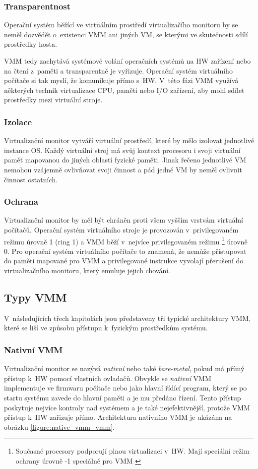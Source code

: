 \subsubsection{Transparentnost}
\label{chapter:virtualization:vmm:demands:transparency}
Operační systém běžící ve virtuálním prostředí virtualizačího monitoru by se neměl dozvědět o~existenci VMM ani jiných VM,
se kterými ve skutečnosti sdílí prostředky hosta.

VMM tedy zachytává systémové volání operačních systémů na HW zařízení nebo na čtení z~paměti a transparentně je vyřizuje.
Operační systém virtuálního počítače si tak myslí, že komunikuje přímo s~HW. V~této fázi VMM využívá některých technik virtualizace
CPU, paměti nebo I/O zařízení, aby mohl sdílet prostředky mezi virtuální stroje.
\subsubsection{Izolace}
\label{chapter:virtualization:vmm:demands:isolation}
Virtualizační monitor vytváří virtuální prostředí, které by mělo izolovat jednotlivé instance OS. Každý virtuální stroj má 
svůj kontext procesoru i svoji virtuální paměť mapovanou do jiných oblastí fyzické paměti. Jinak řečeno jednotlivé VM nemohou
vzájemně ovlivňovat svoji činnost a pád jedné VM by neměl ovlivnit činnost ostatních.
\subsubsection{Ochrana}
\label{chapter:virtualization:vmm:demands:access}
Virtualizační monitor by měl být chráněn proti všem vyšším vrstvám virtuální počítačů. Operační systém virtuálního stroje 
je provozován v~privilegovaném režimu úrovně 1 (ring 1) a VMM běží v~nejvíce privilegovaném režimu 
\footnote[1]{Současné procesory podporují plnou virtualizaci v~HW. Mají speciální  režim ochrany úrovně -1 speciálně pro VMM
\cite{cvut:presentation:virt2}} úrovně 0. Pro operační systém virtuálního počítače to znamená, že nemůže přistupovat do paměti
mapované pro VMM a privilegované instrukce vyvolají přerušení do virtualizačního monitoru, který emuluje jejich chování. 
\subsection{Typy VMM}
\label{chapter:virtualization:vmm:types}
V~následujících třech kapitolách jsou představeny tři typické architektury VMM, které se liší ve způsobu přístupu k~fyzickým
prostředkům systému.
\subsubsection{Nativní VMM}
\label{chapter:virtualization:vmm:types:native}
Virtualizační monitor se nazývá \textit{nativní} nebo také \textit{bare-metal}, pokud má přímý přístup k~HW pomocí vlastních ovladačů.
Obvykle se \textit{nativní} VMM implementuje ve firmwaru počítače nebo jako hlavní řídící program, který se po startu systému
zavede do hlavní paměti a je mu předáno řízení. Tento přístup poskytuje nejvíce kontroly nad systémem a je také nejefektivnější,
protože VMM přístup k~HW zařizuje přímo. Architektura nativního VMM je ukázána na obrázku \ref{figure:native_vmm_vmm}.

